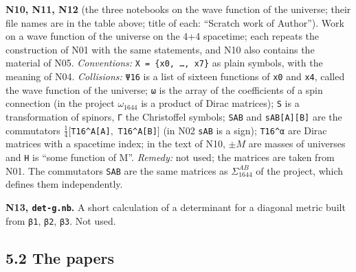\documentclass[
  10pt,
]{article}
\begin{document}
\textbf{N10, N11, N12} (the three notebooks on the wave function of the
universe; their file names are in the table above; title of each:
``Scratch work of Author''). Work on a wave function of the universe on
the 4+4 spacetime; each repeats the construction of N01 with the same
statements, and N10 also contains the material of N05.
\emph{Conventions:} \texttt{X\ =\ \{x0,\ …,\ x7\}} as plain symbols,
with the meaning of N04. \emph{Collisions:} \texttt{Ψ16} is a list of
sixteen functions of \texttt{x0} and \texttt{x4}, called the wave
function of the universe; \texttt{ω} is the array of the coefficients of
a spin connection (in the project \(\omega_{1644}\) is a product of
Dirac matrices); \texttt{S} is a transformation of spinors, \texttt{Γ}
the Christoffel symbols; \texttt{SAB} and \texttt{sAB{[}A{]}{[}B{]}} are
the commutators \(\tfrac14[\)\texttt{T16\^{}A{[}A{]}}\(,\)
\texttt{T16\^{}A{[}B{]}}\(]\) (in N02 \texttt{sAB} is a sign);
\texttt{T16\^{}α} are Dirac matrices with a spacetime index; in the text
of N10, \(\pm M\) are masses of universes and \texttt{H} is ``some
function of M''. \emph{Remedy:} not used; the matrices are taken from
N01. The commutators \texttt{SAB} are the same matrices as
\(\Sigma_{1644}^{AB}\) of the project, which defines them independently.

\textbf{N13, \texttt{det-g.nb}.} A short calculation of a determinant
for a diagonal metric built from \texttt{β1}, \texttt{β2}, \texttt{β3}.
Not used.

\hypertarget{the-papers}{%
\subsection{5.2 The papers}\label{the-papers}}
\end{document}
